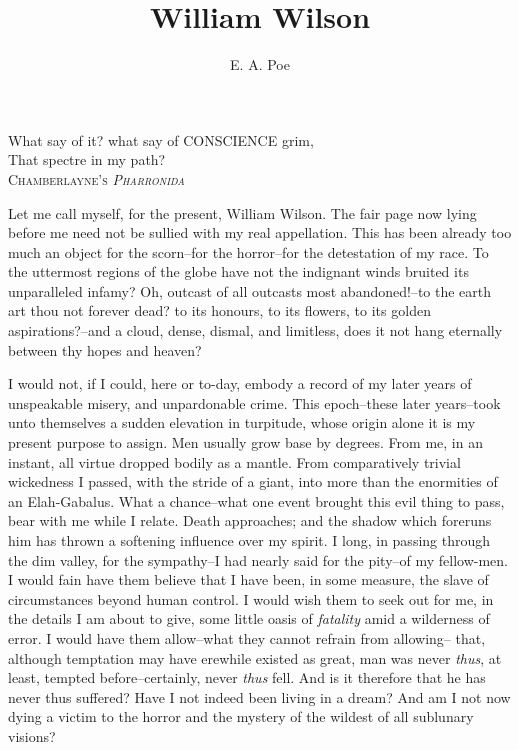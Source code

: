 \documentclass[12pt]{article}
\begin{document}
\title{William Wilson}
\author{E. A. Poe}
\date{}

\maketitle

\hfill
\parbox[b]{8cm}{
\scriptsize
What say of it? what say of CONSCIENCE grim,\\
That spectre in my path?\\
\mbox{}\hspace{2cm} \scshape{Chamberlayne}'s \emph{Pharronida}\\
}

\vskip 1cm

     Let me call myself, for the present, William Wilson.  The fair
page now lying before me need not be sullied with my real
appellation.  This has been already too much an object for the
scorn--for the horror--for the detestation of my race.  To the
uttermost regions of the globe have not the indignant winds bruited
its unparalleled infamy?  Oh, outcast of all outcasts most
abandoned!--to the earth art thou not forever dead? to its honours,
to its flowers, to its golden aspirations?--and a cloud, dense,
dismal, and limitless, does it not hang eternally between thy hopes
and heaven?

     I would not, if I could, here or to-day, embody a record of my
later years of unspeakable misery, and unpardonable crime.  This
epoch--these later years--took unto themselves a sudden elevation
in turpitude, whose origin alone it is my present purpose to
assign.  Men usually grow base by degrees.  From me, in an instant,
all virtue dropped bodily as a mantle.  From comparatively trivial
wickedness I passed, with the stride of a giant, into more than the
enormities of an Elah-Gabalus.  What a chance--what one event
brought this evil thing to pass, bear with me while I relate. 
Death approaches; and the shadow which foreruns him has thrown a
softening influence over my spirit.  I long, in passing through the
dim valley, for the sympathy--I had nearly said for the pity--of my
fellow-men.  I would fain have them believe that I have been, in
some measure, the slave of circumstances beyond human control.  I
would wish them to seek out for me, in the details I am about to
give, some little oasis of \emph{fatality} amid a wilderness of error. 
I would have them allow--what they cannot refrain from allowing--
that, although temptation may have erewhile existed as great, man
was never \emph{thus}, at least, tempted before--certainly, never 
\emph{thus} fell.  And is it therefore that he has never thus suffered? 
Have I not indeed been living in a dream?  And am I not now dying
a victim to the horror and the mystery of the wildest of all
sublunary visions?  
\end{document}
